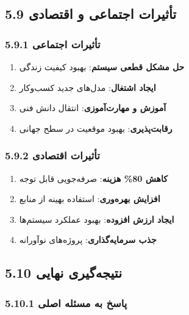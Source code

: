 \documentclass[
]{article}
\providecommand{\tightlist}{%
  \setlength{\itemsep}{0pt}\setlength{\parskip}{0pt}}
\begin{document}
\subsection{5.9 تأثیرات اجتماعی و
اقتصادی}\label{ux62aux623ux62bux6ccux631ux627ux62a-ux627ux62cux62aux645ux627ux639ux6cc-ux648-ux627ux642ux62aux635ux627ux62fux6cc}

\subsubsection{5.9.1 تأثیرات
اجتماعی}\label{ux62aux623ux62bux6ccux631ux627ux62a-ux627ux62cux62aux645ux627ux639ux6cc}

\begin{enumerate}
\def\labelenumi{\arabic{enumi}.}
\tightlist
\item
  \textbf{حل مشکل قطعی سیستم}: بهبود کیفیت زندگی
\item
  \textbf{ایجاد اشتغال}: مدل‌های جدید کسب‌وکار
\item
  \textbf{آموزش و مهارت‌آموزی}: انتقال دانش فنی
\item
  \textbf{رقابت‌پذیری}: بهبود موقعیت در سطح جهانی
\end{enumerate}

\subsubsection{5.9.2 تأثیرات
اقتصادی}\label{ux62aux623ux62bux6ccux631ux627ux62a-ux627ux642ux62aux635ux627ux62fux6cc}

\begin{enumerate}
\def\labelenumi{\arabic{enumi}.}
\tightlist
\item
  \textbf{کاهش 80\% هزینه}: صرفه‌جویی قابل توجه
\item
  \textbf{افزایش بهره‌وری}: استفاده بهینه از منابع
\item
  \textbf{ایجاد ارزش افزوده}: بهبود عملکرد سیستم‌ها
\item
  \textbf{جذب سرمایه‌گذاری}: پروژه‌های نوآورانه
\end{enumerate}

\subsection{5.10 نتیجه‌گیری
نهایی}\label{ux646ux62aux6ccux62cux647ux6afux6ccux631ux6cc-ux646ux647ux627ux6ccux6cc}

\subsubsection{5.10.1 پاسخ به مسئله
اصلی}\label{ux67eux627ux633ux62e-ux628ux647-ux645ux633ux626ux644ux647-ux627ux635ux644ux6cc}
\end{document}

